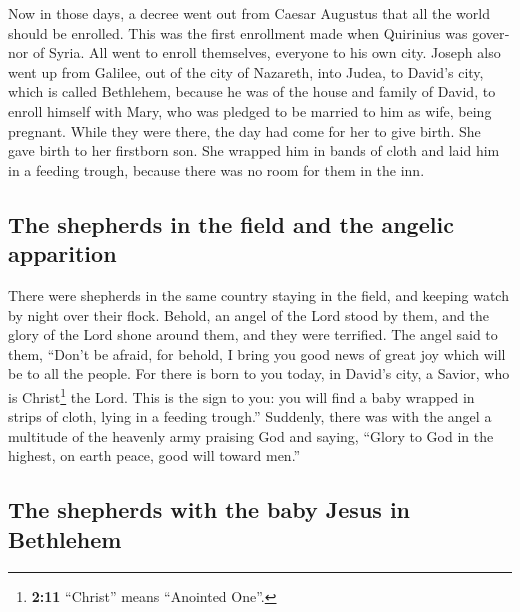 \begin{paracol}{2}
\begin{otherlanguage}{english}
 Now in those days, a decree went out from Caesar Augustus
that all the world should be enrolled.  This was the first
enrollment made when Quirinius was governor of Syria.  All
went to enroll themselves, everyone to his own city. 
Joseph also went up from Galilee, out of the city of Nazareth, into
Judea, to David's city, which is called Bethlehem, because he was of the
house and family of David,  to enroll himself with Mary,
who was pledged to be married to him as wife, being pregnant.
 While they were there, the day had come for her to give
birth.  She gave birth to her firstborn son. She wrapped
him in bands of cloth and laid him in a feeding trough, because there
was no room for them in the inn.

\hypertarget{the-shepherds-in-the-field-and-the-angelic-apparition}{%
\subsection{The shepherds in the field and the angelic
apparition}\label{the-shepherds-in-the-field-and-the-angelic-apparition}}

 There were shepherds in the same country staying in the
field, and keeping watch by night over their flock. 
Behold, an angel of the Lord stood by them, and the glory of the Lord
shone around them, and they were terrified.  The angel
said to them, ``Don't be afraid, for behold, I bring you good news of
great joy which will be to all the people.  For there is
born to you today, in David's city, a Savior, who is Christ\footnote{\textbf{2:11}
  ``Christ'' means ``Anointed One''.} the Lord.  This is
the sign to you: you will find a baby wrapped in strips of cloth, lying
in a feeding trough.''  Suddenly, there was with the
angel a multitude of the heavenly army praising God and saying,
 ``Glory to God in the highest, on earth peace, good will
toward men.''

\hypertarget{the-shepherds-with-the-baby-jesus-in-bethlehem}{%
\subsection{The shepherds with the baby Jesus in
Bethlehem}\label{the-shepherds-with-the-baby-jesus-in-bethlehem}}


\end{otherlanguage}
\end{paracol}
